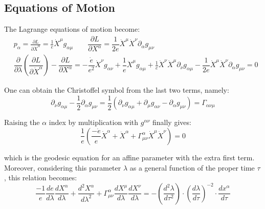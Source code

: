 \documentclass[a4paper,10pt]{article}
\numberwithin{equation}{section}
\begin{document}
\subsection{Equations of Motion}
The Lagrange equations of motion become:
\begin{subequations}
\begin{eqnarray}
    & p_\alpha  = \frac{\partial L}{\partial \dot{X}^\alpha} = \frac{1}{e} \dot{X}^{\mu}g_{\alpha \mu}
    \label{generalizedmomentum}  \qquad \dfrac{\partial L}{\partial X^\alpha} = \dfrac{1}{2e}\dot{X}^\mu \dot{X}^\nu \partial_\alpha g_{\mu\nu}
\\
    & \dfrac{\partial}{\partial \lambda}\left( \dfrac{\partial L}{\partial \dot{X}^\alpha}\right)  - \dfrac{\partial L}{\partial X^\alpha}  =  -\dfrac{\dot{e}}{e^2}\dot{X}^\nu g_{\alpha \nu} + \dfrac{1}{e}\ddot{X}^\mu g_{\alpha \mu} + \frac{1}{e}\dot{X}^\nu \dot{X}^\mu \partial_\nu g_{\alpha \mu} - \dfrac{1}{2e}\dot{X}^\mu \dot{X}^\nu \partial_\alpha g_{\mu \nu} = 0
\end{eqnarray}
\end{subequations}

One can obtain the Christoffel symbol from the last two terms, namely:
\begin{equation}
    \partial_\nu g_{\alpha \mu} - \frac{1}{2}\partial_\alpha g_{\mu \nu} = \frac{1}{2} \left( \partial_\nu g_{\alpha \mu} + \partial_\mu g_{\alpha \nu} - \partial_\alpha g_{\mu \nu} \right) = \Gamma_{\alpha \nu \mu}
\end{equation}

Raising the $\alpha$ index by multiplication with $g^{\alpha \nu}$ finally gives:
\begin{equation}
    \frac{1}{e}\left(\frac{-\dot{e}}{e}\dot{X}^\alpha + \ddot{X}^\alpha + \Gamma^\alpha_{\mu \nu} \dot{X}^\mu \dot{X}^\nu\right) = 0
\end{equation}

which is the geodesic equation for an affine parameter with the extra first term. Moreover, considering this parameter $\lambda$ as a general function of the proper time $\tau$, this relation becomes:
\begin{equation}
    \frac{-1}{e}\frac{de}{d\lambda}\frac{dX^\alpha}{d\lambda} + \frac{d^2X^\alpha}{d\lambda^2} + \Gamma^\alpha_{\mu \nu}\frac{dX^\mu}{d\lambda}\frac{dX^\nu}{d\lambda} = - \left(\frac{d^2 \lambda}{d\tau^2} \right)\cdot \left(\frac{d\lambda}{d\tau} \right)^{-2}\cdot\frac{dx^\alpha}{d\tau}
\end{equation}
\end{document}

